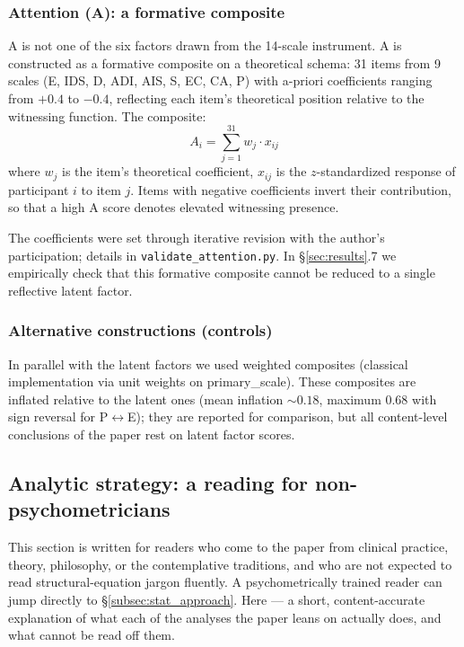 \subsubsection{Attention (A): a formative composite}

A is not one of the six factors drawn from the 14-scale instrument. A is constructed as a formative composite on a theoretical schema: 31 items from 9 scales (E, IDS, D, ADI, AIS, S, EC, CA, P) with a-priori coefficients ranging from $+0.4$ to $-0.4$, reflecting each item's theoretical position relative to the witnessing function. The composite:
\[
A_i = \sum_{j=1}^{31} w_j \cdot x_{ij}
\]
where $w_j$ is the item's theoretical coefficient, $x_{ij}$ is the $z$-standardized response of participant $i$ to item $j$. Items with negative coefficients invert their contribution, so that a high A score denotes elevated witnessing presence.

The coefficients were set through iterative revision with the author's participation; details in \texttt{validate\_attention.py}. In §\ref{sec:results}.7 we empirically check that this formative composite cannot be reduced to a single reflective latent factor.

\subsubsection{Alternative constructions (controls)}

In parallel with the latent factors we used weighted composites (classical implementation via unit weights on primary\_scale). These composites are inflated relative to the latent ones (mean inflation $\sim 0.18$, maximum $0.68$ with sign reversal for P$\leftrightarrow$E); they are reported for comparison, but all content-level conclusions of the paper rest on latent factor scores.

\subsection{Analytic strategy: a reading for non-psychometricians}
\label{subsec:analytic_primer}

This section is written for readers who come to the paper from clinical practice, theory, philosophy, or the contemplative traditions, and who are not expected to read structural-equation jargon fluently. A psychometrically trained reader can jump directly to §\ref{subsec:stat_approach}. Here --- a short, content-accurate explanation of what each of the analyses the paper leans on actually does, and what cannot be read off them.

